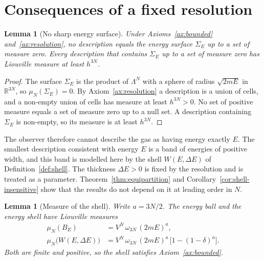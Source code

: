 \documentclass[11pt,a4paper]{article}
\newtheorem{lemma}[theorem]{Lemma}
\theoremstyle{definition}
\theoremstyle{remark}
\newcommand{\R}{\mathbb{R}}
\begin{document}
\section{Consequences of a fixed resolution}
\label{sec:resolution}

\begin{lemma}[No sharp energy surface]
\label{lem:noshell}
Under Axioms~\ref{ax:bounded} and~\ref{ax:resolution}, no description equals the energy surface $\Sigma_E$ up to a set of measure zero.
Every description that contains $\Sigma_E$ up to a set of measure zero has Liouville measure at least $h^{3N}$.
\end{lemma}

\begin{proof}
The surface $\Sigma_E$ is the product of $\Lambda^{N}$ with a sphere of radius $\sqrt{2mE}$ in $\R^{3N}$, so $\mu_N(\Sigma_E)=0$.
By Axiom~\ref{ax:resolution} a description is a union of cells, and a non-empty union of cells has measure at least $h^{3N}>0$.
No set of positive measure equals a set of measure zero up to a null set.
A description containing $\Sigma_E$ is non-empty, so its measure is at least $h^{3N}$.
\end{proof}

The observer therefore cannot describe the gas as having energy exactly $E$.
The smallest description consistent with energy $E$ is a band of energies of positive width, and this band is modelled here by the shell $W(E,\Delta E)$ of Definition~\ref{def:shell}.
The thickness $\Delta E>0$ is fixed by the resolution and is treated as a parameter.
Theorem~\ref{thm:equipartition} and Corollary~\ref{cor:shell-insensitive} show that the results do not depend on it at leading order in $N$.

\begin{lemma}[Measure of the shell]
\label{lem:shell-measure}
Write $a=3N/2$.
The energy ball and the energy shell have Liouville measures
\begin{align}
\mu_N(B_E)&=V^{N}\,\omega_{3N}\,(2mE)^{a},\label{eq:ball-measure}\\
\mu_N\bigl(W(E,\Delta E)\bigr)&=V^{N}\,\omega_{3N}\,(2mE)^{a}\,\bigl[1-(1-\delta)^{a}\bigr].\label{eq:shell-measure}
\end{align}
Both are finite and positive, so the shell satisfies Axiom~\ref{ax:bounded}.
\end{lemma}
\end{document}
